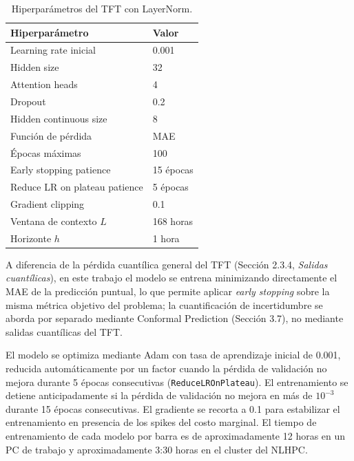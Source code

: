 \begin{table}[htbp]
    \centering
    \begin{tabular}{ll}
        \toprule
        Hiperparámetro & Valor \\
        \midrule
        Learning rate inicial         & 0.001 \\
        Hidden size                   & 32 \\
        Attention heads               & 4 \\
        Dropout                       & 0.2 \\
        Hidden continuous size        & 8 \\
        Función de pérdida            & MAE \\
        Épocas máximas                & 100 \\
        Early stopping patience       & 15 épocas \\
        Reduce LR on plateau patience & 5 épocas \\
        Gradient clipping             & 0.1 \\
        Ventana de contexto $L$       & 168 horas \\
        Horizonte $h$                 & 1 hora \\
        \bottomrule
    \end{tabular}
    \caption{Hiperparámetros del TFT con LayerNorm.}
    \label{tab:tft_config}
\end{table}

A diferencia de la pérdida cuantílica general del TFT (Sección 2.3.4, \textit{Salidas cuantílicas}), en este trabajo el modelo se entrena minimizando directamente el MAE de la predicción puntual, lo que permite aplicar \textit{early stopping} sobre la misma métrica objetivo del problema; la cuantificación de incertidumbre se aborda por separado mediante Conformal Prediction (Sección 3.7), no mediante salidas cuantílicas del TFT.

El modelo se optimiza mediante Adam con tasa de aprendizaje inicial de 0.001, reducida automáticamente por un factor cuando la pérdida de validación no mejora durante 5 épocas consecutivas (\texttt{ReduceLROnPlateau}). El entrenamiento se detiene anticipadamente si la pérdida de validación no mejora en más de $10^{-3}$ durante 15 épocas consecutivas. El gradiente se recorta a 0.1 para estabilizar el entrenamiento en presencia de los spikes del costo marginal. El tiempo de entrenamiento de cada modelo por barra es de aproximadamente 12 horas en un PC de trabajo y aproximadamente 3:30 horas en el cluster del NLHPC.

